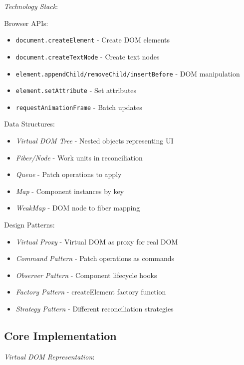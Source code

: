 \documentclass[11pt]{article}
\begin{document}
\emph{Technology Stack}:

Browser APIs:

\begin{itemize}
\item \texttt{document.createElement} - Create DOM elements
\item \texttt{document.createTextNode} - Create text nodes
\item \texttt{element.appendChild/removeChild/insertBefore} - DOM manipulation
\item \texttt{element.setAttribute} - Set attributes
\item \texttt{requestAnimationFrame} - Batch updates
\end{itemize}

Data Structures:

\begin{itemize}
\item \emph{Virtual DOM Tree} - Nested objects representing UI
\item \emph{Fiber/Node} - Work units in reconciliation
\item \emph{Queue} - Patch operations to apply
\item \emph{Map} - Component instances by key
\item \emph{WeakMap} - DOM node to fiber mapping
\end{itemize}

Design Patterns:

\begin{itemize}
\item \emph{Virtual Proxy} - Virtual DOM as proxy for real DOM
\item \emph{Command Pattern} - Patch operations as commands
\item \emph{Observer Pattern} - Component lifecycle hooks
\item \emph{Factory Pattern} - createElement factory function
\item \emph{Strategy Pattern} - Different reconciliation strategies
\end{itemize}
\subsection{Core Implementation}
\label{sec:orgeb5d4bf}

\emph{Virtual DOM Representation}:
\end{document}
